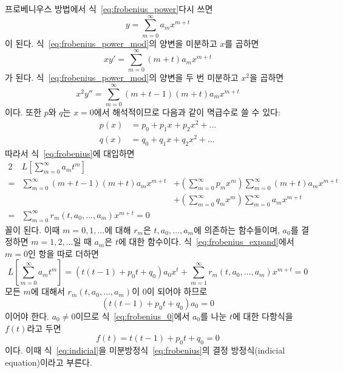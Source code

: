\documentclass[../engineering_mathematics_lecture_note.tex]{subfiles}
\begin{document}
프로베니우스 방법에서 식~\ref{eq:frobenius_power}\을 다시 쓰면
\begin{equation} \label{eq:frobenius_power_mod}
    y = \sum^{\infty}_{m = 0} a_m x^{m + t}
\end{equation}
이 된다.
식~\ref{eq:frobenius_power_mod}의 양변을 미분하고 $x$를 곱하면
\begin{equation} \label{eq:frobenius_xy}
    xy' = \sum^{\infty}_{m = 0} (m + t) a_m x^{m + t}
\end{equation}
가 된다.
식~\ref{eq:frobenius_power_mod}의 양변을 두 번 미분하고 $x^2$을 곱하면
\begin{equation} \label{eq:frobenius_x2y}
    x^2 y'' = \sum^{\infty}_{m = 0} (m + t - 1)(m + t) a_m x^{m + t}
\end{equation}
이다.
또한 $p$와 $q$는 $x = 0$에서 해석적이므로 다음과 같이 멱급수로 쓸 수 있다:
\begin{align}
    p(x) &= p_0 + p_1 x + p_2 x^2 + \dots\label{eq:frobenius_p}\\
    q(x) &= q_0 + q_1 x + q_2 x^2 + \dots\label{eq:frobenius_q}
\end{align}
따라서 \를 식~\ref{eq:frobenius}에 대입하면
\begin{alignat}{2}
    &L \left[ \sum^{\infty}_{m = 0} a_m t^m \right]\nonumber\\
    = &\sum^{\infty}_{m = 0} (m + t - 1)(m + t) a_m x^{m + t} &+ \left(\sum^{\infty}_{m = 0} p_m x^m \right) \sum^{\infty}_{m = 0} (m + t) a_m x^{m + t}\nonumber\\
      &&+ \left(\sum^{\infty}_{m = 0} q_m x^m \right) \sum^{\infty}_{m = 0} a_m x^{m + t}\label{eq:frobenius_expand}\\
    = & \sum^{\infty}_{m = 0} r_m(t, a_0, \dots, a_m) x^{m + t} = 0 \nonumber
\end{alignat}
꼴이 된다.
이때 $m = 0, 1, \dots$에 대해 $r_m$은 $t, a_0, \dots, a_m$에 의존하는 함수들이며, $a_0$를 결정하면 $m = 1, 2, \dots$일 때 $a_m$은 $t$에 대한 함수이다.
식~\ref{eq:frobenius_expand}에서 $m = 0$인 항을 따로 더하면
\begin{equation*}
    L \left[ \sum^{\infty}_{m = 0} a_m t^m \right] = \left( t(t - 1) + p_0 t + q_0 \right) a_0 x^t + \sum^{\infty}_{m = 1} r_m(t, a_0, \dots, a_m) x^{m + t} = 0
\end{equation*}
모든 $m$에 대해서 $r_m(t, a_0, \dots, a_m)$이 0이 되어야 하므로
\begin{equation} \label{eq:frobenius_0}
    \left( t(t - 1) + p_0 t + q_0 \right) a_0 = 0
\end{equation}
이어야 한다.
$a_0 \neq 0$이므로 식~\ref{eq:frobenius_0}에서 $a_0$를 나눈 $t$에 대한 다항식을 $f(t)$라고 두면
\begin{equation} \label{eq:indicial}
    f(t) = t(t - 1) + p_0 t + q_0 = 0
\end{equation}
이다.
이때 식~\ref{eq:indicial}을 미분방정식~\ref{eq:frobenius}의 결정 방정식(indicial equation)이라고 부른다.
\end{document}
